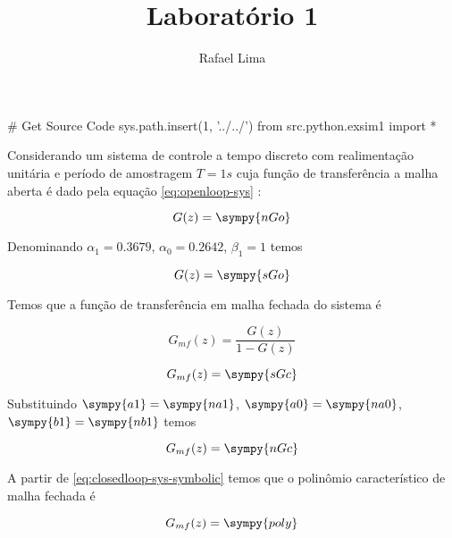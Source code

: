 \documentclass[a4paper,11pt]{article}
\title{Laboratório 1} %
\author{Rafael Lima}
\begin{document}

\section{}

\begin{sympycode}
# Get Source Code
sys.path.insert(1, '../../')
from src.python.exsim1 import *
\end{sympycode}

Considerando um sistema de controle a tempo discreto com realimentação unitária e período de amostragem $T = 1s$ cuja função de transferência a malha aberta é dado pela equação \ref{eq:openloop-sys} :

\begin{equation}\label{eq:openloop-sys}
    G(z) = \sympy{nGo}
\end{equation}

Denominando $\alpha_1 = 0.3679$, $\alpha_0 = 0.2642$, $\beta_1 = 1$ temos

\begin{equation}\label{eq:openloop-sys-symbolic}
    G(z) = \sympy{sGo}
\end{equation}

Temos que a função de transferência em malha fechada do sistema é

$$G_{mf}(z) = \frac{G(z)}{1-G(z)}$$

\begin{equation}\label{eq:closedloop-sys-symbolic}
    G_{mf}(z) = \sympy{sGc}
\end{equation}

Substituindo $\sympy{a1} = \sympy{na1}$, $\sympy{a0} = \sympy{na0}$, $\sympy{b1} = \sympy{nb1}$ temos

\begin{equation}\label{eq:closedloop-sys}
    G_{mf}(z) = \sympy{nGc}
\end{equation}

A partir de \ref{eq:closedloop-sys-symbolic} temos que o polinômio característico de malha fechada é

\begin{equation}\label{eq:poly-sys-symbolic}
    G_{mf}(z) = \sympy{poly}
\end{equation}
\end{document}
